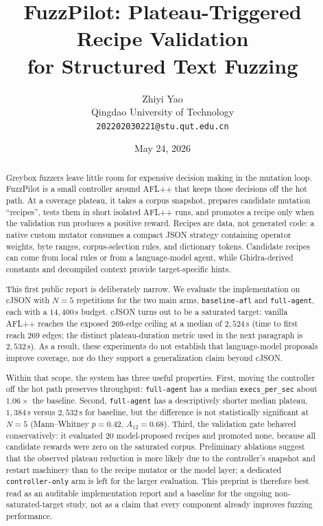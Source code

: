 \documentclass[11pt]{article}
\title{FuzzPilot: Plateau-Triggered Recipe Validation\\
  for Structured Text Fuzzing}
\author{Zhiyi Yao\\
  Qingdao University of Technology\\
  \texttt{202202030221@stu.qut.edu.cn}}
\date{May 24, 2026}
\begin{document}
\maketitle

\begin{abstract}
Greybox fuzzers leave little room for expensive decision making in
the mutation loop. FuzzPilot is a small controller around AFL++ that
keeps those decisions off the hot path. At a coverage plateau, it
takes a corpus snapshot, prepares candidate mutation ``recipes'',
tests them in short isolated AFL++ runs, and promotes a recipe only
when the validation run produces a positive reward. Recipes are data,
not generated code: a native custom mutator consumes a compact JSON
strategy containing operator weights, byte ranges, corpus-selection
rules, and dictionary tokens. Candidate recipes can come from local
rules or from a language-model agent, while Ghidra-derived constants
and decompiled context provide target-specific hints.

This first public report is deliberately narrow. We evaluate the
implementation on cJSON with $N{=}5$ repetitions for the two main
arms, \texttt{baseline-afl} and \texttt{full-agent}, each with a
$14{,}400$\,s budget. cJSON turns out to be a saturated target:
vanilla AFL++ reaches the exposed 269-edge ceiling at a median of
$2{,}524$\,s (time to first reach 269 edges; the distinct
plateau-duration metric used in the next paragraph is $2{,}532$\,s).
As a result, these experiments do not establish
that language-model proposals improve coverage, nor do they support a
generalization claim beyond cJSON.

Within that scope, the system has three useful properties. First,
moving the controller off the hot path preserves throughput:
\texttt{full-agent} has a median \texttt{execs\_per\_sec} about
$1.06\times$ the baseline. Second, \texttt{full-agent} has a
descriptively shorter median plateau, $1{,}384$\,s versus
$2{,}532$\,s for baseline, but the difference is not statistically
significant at $N{=}5$ (Mann--Whitney $p{=}0.42$,
$A_{12}{=}0.68$). Third, the validation gate behaved conservatively:
it evaluated 20 model-proposed recipes and promoted none, because all
candidate rewards were zero on the saturated corpus. Preliminary
ablations suggest that the observed plateau reduction is more likely
due to the controller's snapshot and restart machinery than to the
recipe mutator or the model layer; a dedicated \texttt{controller-only}
arm is left for the larger evaluation. This preprint is therefore best
read as an auditable implementation report and a baseline for the
ongoing non-saturated-target study, not as a claim that every component
already improves fuzzing performance.
\end{abstract}
\end{document}
